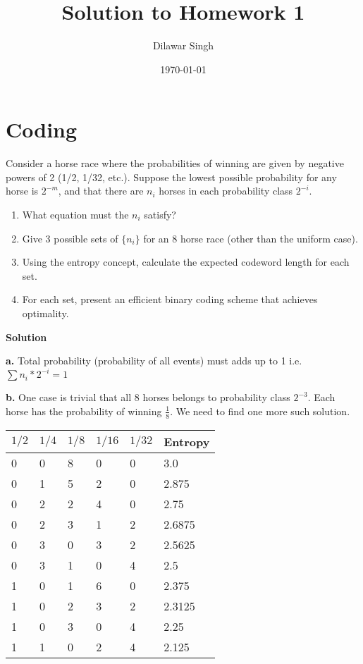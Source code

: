 \documentclass[]{article}
\title{Solution to Homework 1}
\author{Dilawar Singh}
\date{\today}
\providecommand{\tightlist}{%
\setlength{\itemsep}{0pt}\setlength{\parskip}{0pt}}
\begin{document}
\maketitle

\section{Coding}\label{coding}

Consider a horse race where the probabilities of winning are given by
negative powers of 2 (1/2, 1/32, etc.). Suppose the lowest possible
probability for any horse is \(2^{-m}\), and that there are \(n_i\)
horses in each probability class \(2^{-i}\).

\begin{enumerate}
\def\labelenumi{\alph{enumi}.}
\tightlist
\item
  What equation must the \(n_i\) satisfy?
\item
  Give 3 possible sets of \(\{n_i\}\) for an 8 horse race (other than
  the uniform case).
\item
  Using the entropy concept, calculate the expected codeword length for
  each set.
\item
  For each set, present an efficient binary coding scheme that achieves
  optimality.
\end{enumerate}

\textbf{Solution}

\textbf{a.} Total probability (probability of all events) must adds up
to 1 i.e. \(\sum n_i * 2^{-i} = 1\)

\textbf{b.} One case is trivial that all 8 horses belongs to probability
class \(2^{-3}\). Each horse has the probability of winning
\(\frac{1}{8}\). We need to find one more such solution.

\begin{longtable}[]{@{}llllll@{}}
\toprule
\(1/2\) & \(1/4\) & \(1/8\) & \(1/16\) & \(1/32\) &
Entropy\tabularnewline
\midrule
\endhead
0 & 0 & 8 & 0 & 0 & 3.0\tabularnewline
0 & 1 & 5 & 2 & 0 & 2.875\tabularnewline
0 & 2 & 2 & 4 & 0 & 2.75\tabularnewline
0 & 2 & 3 & 1 & 2 & 2.6875\tabularnewline
0 & 3 & 0 & 3 & 2 & 2.5625\tabularnewline
0 & 3 & 1 & 0 & 4 & 2.5\tabularnewline
1 & 0 & 1 & 6 & 0 & 2.375\tabularnewline
1 & 0 & 2 & 3 & 2 & 2.3125\tabularnewline
1 & 0 & 3 & 0 & 4 & 2.25\tabularnewline
1 & 1 & 0 & 2 & 4 & 2.125\tabularnewline
\bottomrule
\end{longtable}
\end{document}
